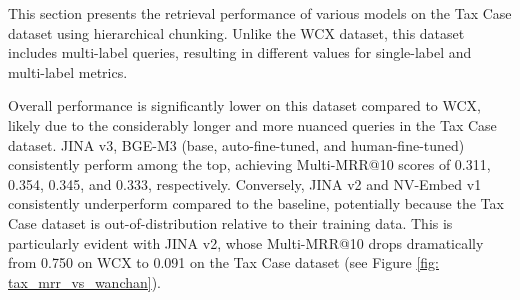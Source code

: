 

This section presents the retrieval performance of various models on the Tax Case dataset using hierarchical chunking. Unlike the WCX dataset, this dataset includes multi-label queries, resulting in different values for single-label and multi-label metrics.

Overall performance is significantly lower on this dataset compared to WCX, likely due to the considerably longer and more nuanced queries in the Tax Case dataset. JINA v3, BGE-M3 (base, auto-fine-tuned, and human-fine-tuned) consistently perform among the top, achieving Multi-MRR@10 scores of 0.311, 0.354, 0.345, and 0.333, respectively. Conversely, JINA v2 and NV-Embed v1 consistently underperform compared to the baseline, potentially because the Tax Case dataset is out-of-distribution relative to their training data. This is particularly evident with JINA v2, whose Multi-MRR@10 drops dramatically from 0.750 on WCX to 0.091 on the Tax Case dataset (see Figure \ref{fig: tax_mrr_vs_wanchan}).

